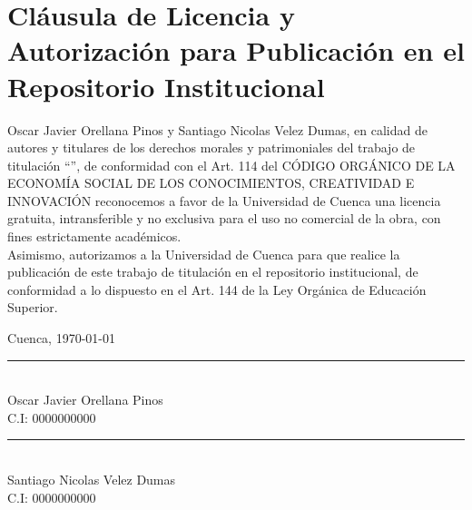 \chapter*{Cláusula de Licencia y Autorización para Publicación en el Repositorio Institucional}
   
Oscar Javier Orellana Pinos y Santiago Nicolas Velez Dumas, en calidad de autores y titulares de los derechos morales y patrimoniales del trabajo de titulación “\titulotesis{}”, de conformidad con el Art. 114 del CÓDIGO ORGÁNICO DE LA ECONOMÍA SOCIAL DE LOS CONOCIMIENTOS, CREATIVIDAD E INNOVACIÓN reconocemos a favor de la Universidad de Cuenca una licencia gratuita, intransferible y no exclusiva para el uso no comercial de la obra, con fines estrictamente académicos.\\

Asimismo, autorizamos a la Universidad de Cuenca para que realice la publicación de este trabajo de titulación en el repositorio institucional, de conformidad a lo dispuesto en el Art. 144 de la Ley Orgánica de Educación Superior.

\vspace{3cm}

Cuenca, \today

\vspace{3cm}


\begin{center}
    \noindent\rule{8cm}{0.4pt}\\
    Oscar Javier Orellana Pinos\\
    C.I: 0000000000  %

    \vspace{1.5cm}

    \noindent\rule{8cm}{0.4pt}\\
    Santiago Nicolas Velez Dumas\\
    C.I: 0000000000  %
\end{center}
